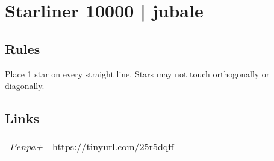 \section{Starliner 10000 | {\normalfont jubale}}
\label{sec:16-starliner-10000-jubale}

\subsection*{Rules}
\begin{markdown}
Place 1 star on every straight line.  Stars may not touch orthogonally or diagonally.
\end{markdown}
\subsection*{Links}
\begin{tabularx}{\textwidth}{l X}
\emph{Penpa+} & \url{https://tinyurl.com/25r5dqff} \\
\end{tabularx}
\pagebreak
